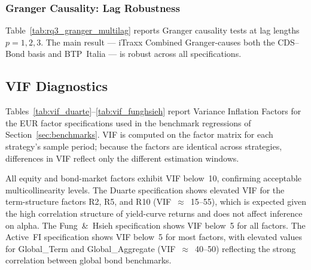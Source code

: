  

 
\subsubsection{Granger Causality: Lag Robustness}
\label{app:granger_multilag}

Table~\ref{tab:rq3_granger_multilag} reports Granger causality tests
at lag lengths $p = 1, 2, 3$. The main result --- iTraxx Combined
Granger-causes both the CDS--Bond basis and BTP~Italia --- is robust
across all specifications.



 
\subsection{VIF Diagnostics}
\label{app:vif}
 
Tables~\ref{tab:vif_duarte}--\ref{tab:vif_funghsieh} report Variance
Inflation Factors for the EUR factor specifications used in the benchmark
regressions of Section~\ref{sec:benchmarks}. VIF is computed on the factor matrix for each
strategy's sample period; because the factors are identical across strategies,
differences in VIF reflect only the different estimation windows.
 
All equity and bond-market factors exhibit VIF below~10, confirming
acceptable multicollinearity levels. The Duarte specification shows
elevated VIF for the term-structure factors R2, R5, and R10
(VIF~$\approx$~15--55), which is expected given the high correlation
structure of yield-curve returns and does not affect inference on alpha.
The Fung~\&~Hsieh specification shows VIF below~5 for all factors.
The Active~FI specification shows VIF below~5 for most factors, with
elevated values for Global\_Term and Global\_Aggregate (VIF~$\approx$~40--50)
reflecting the strong correlation between global bond benchmarks.
 

 

 
